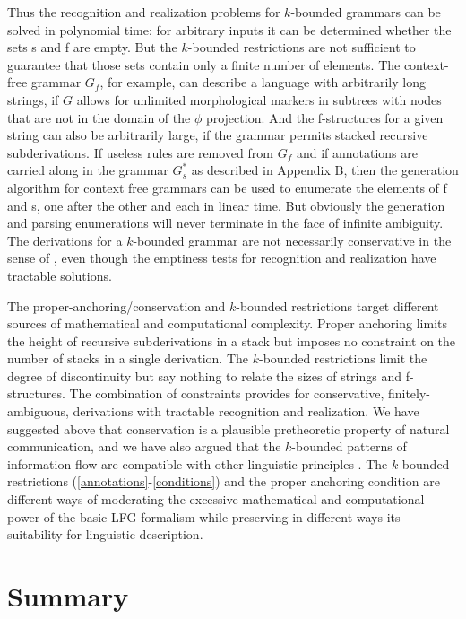 \documentclass[output=paper,hidelinks]{langscibook}
\begin{document}
Thus the recognition and realization problems for $k$-bounded grammars can be solved in polynomial time: for arbitrary inputs it can be determined whether the sets \ParG s and \GenG f are empty.  But the $k$-bounded restrictions are not sufficient to guarantee that those sets contain only a finite number of elements.  The context-free grammar $G_f$, for example, can describe a language with arbitrarily long strings, if $G$ allows for unlimited morphological markers in subtrees with nodes that are not in the domain of the $\phi$ projection.  And the f-structures for a given string can also be arbitrarily large, if the grammar permits stacked recursive subderivations.  If useless rules are removed from $G_f$ and if annotations are carried along in the grammar $G^*_s$ as described in Appendix B, then the generation algorithm for context free grammars can be used to enumerate the elements of \GenG f and  \ParG s, one after the other and each in linear time.  But obviously the generation and parsing enumerations will never terminate in the face of infinite ambiguity. The derivations for a $k$-bounded grammar are not necessarily conservative in the sense of , even though the emptiness tests for recognition and realization have tractable solutions.

The proper-anchoring/conservation and $k$-bounded restrictions target different sources of mathematical and computational complexity.  Proper anchoring limits the height of recursive subderivations in a stack but imposes no constraint on the number of stacks in a single derivation. The $k$-bounded restrictions limit the degree of discontinuity but say nothing to relate the sizes of strings and f-structures. The combination of constraints provides for conservative, finitely-ambiguous, derivations with tractable recognition and realization.  We have suggested above that conservation is a plausible pretheoretic property of natural communication, and we have also argued that the $k$-bounded patterns of information flow are compatible with other linguistic principles \citep{KaplanWedekind2019, wed:kap:20}.  The $k$-bounded restrictions \mbox{(\ref{annotations}-\ref{conditions})} and the proper anchoring condition  are different ways of moderating the excessive mathematical and computational power of the basic LFG formalism while preserving in different ways its suitability for linguistic description.  


\section{Summary}
\end{document}
